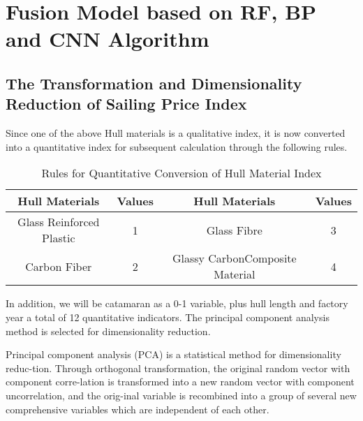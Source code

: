 \section{Fusion Model based on RF, BP and CNN Algorithm}
\subsection{The Transformation and Dimensionality Reduction of Sailing Price Index}
Since one of the above Hull materials is a qualitative index, it is now converted into a quantitative index for subsequent calculation through the following rules.

\begin{table}[htbp]
    \begin{center}
    \caption{Rules for Quantitative Conversion of Hull Material Index}
    \resizebox{\textwidth}{!}
    {\begin{tabular}{c c c c}
    \toprule[2pt]
    Hull Materials&Values&Hull Materials&Values\\ %
    \midrule
    Glass Reinforced Plastic& 1 &Glass Fibre                     & 3 \\
    Carbon Fiber            & 2 &Glassy CarbonComposite Material & 4 \\
    \bottomrule[2pt]
    \end{tabular}}
    \end{center}
\end{table}

In addition, we will be catamaran as a 0-1 variable, plus hull length and factory year a total of 12 quantitative indicators. The principal component analysis method is selected for dimensionality reduction.

Principal component analysis (PCA) is a statistical method for dimensionality reduc-tion. Through orthogonal transformation, the original random vector with component corre-lation is transformed into a new random vector with component uncorrelation, and the orig-inal variable is recombined into a group of several new comprehensive variables which are independent of each other. 

